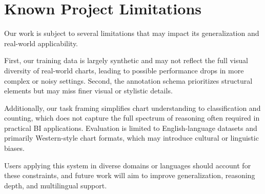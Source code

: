 \documentclass[11pt]{article}
\begin{document}
\section{Known Project Limitations}

Our work is subject to several limitations that may impact its generalization and real-world applicability.

First, our training data is largely synthetic and may not reflect the full visual diversity of real-world charts, leading to possible performance drops in more complex or noisy settings. Second, the annotation schema prioritizes structural elements but may miss finer visual or stylistic details.

Additionally, our task framing simplifies chart understanding to classification and counting, which does not capture the full spectrum of reasoning often required in practical BI applications. Evaluation is limited to English-language datasets and primarily Western-style chart formats, which may introduce cultural or linguistic biases.

Users applying this system in diverse domains or languages should account for these constraints, and future work will aim to improve generalization, reasoning depth, and multilingual support.



\appendix
\end{document}
